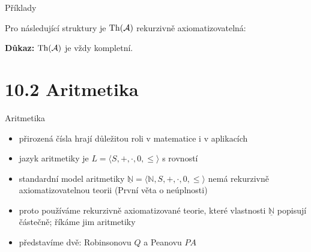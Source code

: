 \documentclass{beamer}
\begin{document}
\begin{frame}{Příklady}

    Pro následující struktury je $\operatorname{Th}(\mathcal{A})$ rekurzivně axiomatizovatelná:


    \medskip

    \pause
    \pause
    \textbf{Důkaz:} $\operatorname{Th}(\mathcal{A})$ je vždy kompletní.

    \pause

\end{frame}


\section{10.2 Aritmetika}


\begin{frame}{Aritmetika}

    \begin{itemize}[<+->]
        \item přirozená čísla hrají důležitou roli v matematice i v aplikacích
        \item \alert{jazyk aritmetiky} je $L=\langle S,+,\cdot,0,\leq\rangle$ s rovností
        \item \alert{standardní model aritmetiky}  $\underline{\mathbb N}=\langle\mathbb N,S,+,\cdot,0,\leq\rangle$ nemá rekurzivně axiomatizovatelnou teorii (První věta o neúplnosti)
        \item proto používáme rekurzivně axiomatizované teorie, které vlastnosti $\underline{\mathbb N}$ popisují částečně; říkáme jim \alert{aritmetiky}       
        \item představíme dvě: \alert{Robinsonovu} $Q$ a \alert{Peanovu} $PA$
    \end{itemize}

\end{frame}
\end{document}
